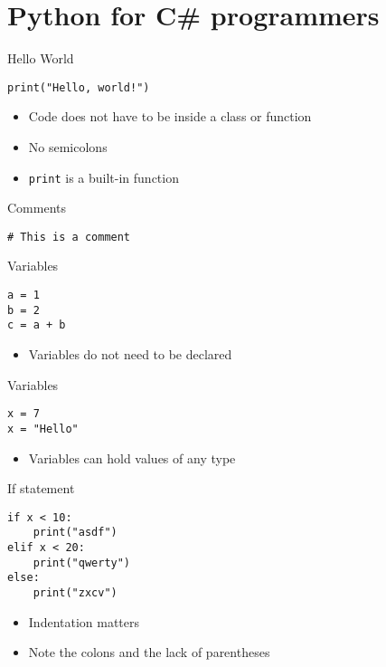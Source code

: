 \part{Python for C\# programmers}
\frame{\partpage}

\begin{frame}[fragile]{Hello World}
    \begin{lstlisting}
print("Hello, world!")
    \end{lstlisting}
    \begin{itemize}
        \pause\item Code does not have to be inside a class or function
        \pause\item No semicolons
        \pause\item \lstinline{print} is a built-in function
    \end{itemize}
\end{frame}

\begin{frame}[fragile]{Comments}
    \begin{lstlisting}
# This is a comment
    \end{lstlisting}
\end{frame}

\begin{frame}[fragile]{Variables}
    \begin{lstlisting}
a = 1
b = 2
c = a + b
    \end{lstlisting}
    \begin{itemize}
        \pause\item Variables do not need to be declared
    \end{itemize}
\end{frame}

\begin{frame}[fragile]{Variables}
    \begin{lstlisting}
x = 7
x = "Hello"
    \end{lstlisting}
    \begin{itemize}
        \pause\item Variables can hold values of any type
    \end{itemize}
\end{frame}

\begin{frame}[fragile]{If statement}
    \begin{lstlisting}
if x < 10:
    print("asdf")
elif x < 20:
    print("qwerty")
else:
    print("zxcv")
    \end{lstlisting}
    \begin{itemize}
        \pause\item Indentation matters
        \pause\item Note the colons and the lack of parentheses
    \end{itemize}
\end{frame}

